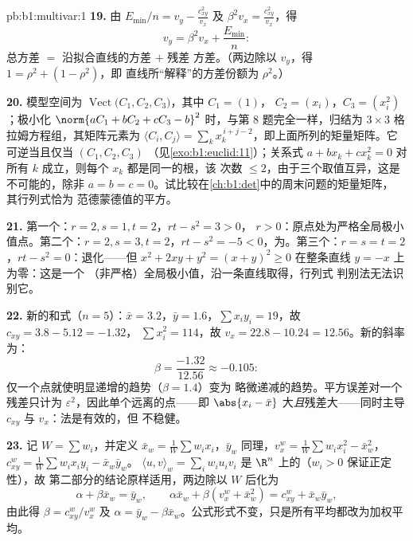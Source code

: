 \begin{solution}{pb:b1:multivar:1}
\textbf{19.} 由 $E_{\min}/n = v_y - \frac{c_{xy}^2}{v_x}$ 及
$\beta^2 v_x = \frac{c_{xy}^2}{v_x}$，得
\[
v_y = \beta^2 v_x + \frac{E_{\min}}n :
\]
总方差 $=$ 沿拟合直线的方差 $+$ 残差
方差。（两边除以 $v_y$，得 $1 = \rho^2 + (1 - \rho^2)$，即
直线所“解释”的方差份额为 $\rho^2$。）

\textbf{20.} 模型空间为
$\operatorname{Vect}\bigl(C_1, C_2, C_3\bigr)$，其中 $C_1 = (1)$，
$C_2 = (x_i)$，$C_3 = (x_i^2)$；极小化 $\norm{aC_1 + bC_2 +
cC_3 - b}^2$ 时，与第 8 题完全一样，归结为 $3\times3$
格拉姆方程组，其矩阵元素为 $\langle C_i, C_j\rangle =
\sum_k x_k^{\,i+j-2}$，即上面所列的矩量矩阵。它
可逆当且仅当 $(C_1, C_2, C_3)$ 
（见\cref{exo:b1:euclid:11}）；关系式 $a + bx_k + cx_k^2 = 0$
对所有 $k$ 成立，则每个 $x_k$ 都是同一的根，该
次数 $\leq 2$，由于三个取值互异，这是不可能的，除非 $a
= b = c = 0$。试比较在\cref{ch:b1:det}中的周末问题的矩量矩阵，
其行列式恰为
范德蒙德值的平方。

\textbf{21.} 第一个：$r = 2, s = 1, t = 2$，$rt - s^2 = 3 > 0$，
$r > 0$：原点处为严格全局极小值点。第二个：$r = 2, s
= 3, t = 2$，$rt - s^2 = -5 < 0$，为。第三个：$r = s = t =
2$，$rt - s^2 = 0$：退化——但 $x^2 + 2xy + y^2 = (x +
y)^2 \geq 0$ 在整条直线 $y = -x$ 上为零：这是一个
（非严格）全局极小值，沿一条直线取得，行列式
判别法无法识别它。

\textbf{22.} 新的和式（$n = 5$）：$\bar x = 3.2$，$\bar y =
1.6$，$\sum x_iy_i = 19$，故 $c_{xy} = 3.8 - 5.12 = -1.32$，
$\sum x_i^2 = 114$，故 $v_x = 22.8 - 10.24 = 12.56$。新的斜率为：
\[
\beta = \frac{-1.32}{12.56} \approx -0.105 :
\]
仅一个点就使明显递增的趋势（$\beta = 1.4$）变为
略微递减的趋势。平方误差对一个残差只计为
$\varepsilon^2$，因此单个远离的点——即
$\abs{x_{i} - \bar x}$ 大\emph{且}残差大——同时主导
$c_{xy}$ 与 $v_x$：法是有效的，但
不稳健。

\textbf{23.} 记 $W = \sum w_i$，并定义 $\bar x_w =
\frac1W\sum w_ix_i$，$\bar y_w$ 同理，$v_x^w = \frac1W\sum
w_ix_i^2 - \bar x_w^2$，$c^w_{xy} = \frac1W\sum w_ix_iy_i - \bar
x_w\bar y_w$。 $\langle u, v\rangle_w = \sum_i w_iu_iv_i$
是 $\R^n$ 上的（$w_i > 0$ 保证正定性），故
第二部分的结论原样适用，两边除以 $W$
后化为
\[
\alpha + \beta\bar x_w = \bar y_w,
\qquad
\alpha\bar x_w + \beta(v^w_x + \bar x_w^2) = c^w_{xy} + \bar
x_w\bar y_w ,
\]
由此得 $\beta = c^w_{xy}/v^w_x$ 及 $\alpha = \bar y_w -
\beta\bar x_w$。公式形式不变，只是所有平均都改为加权平均。


\end{solution}
